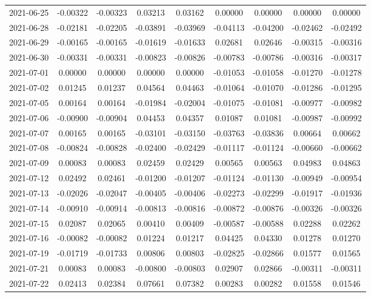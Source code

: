 {\begin{footnotesize}
\begin{longtable}{lcccccccc}
2021-06-25 & -0.00322 & -0.00323 & 0.03213 & 0.03162 & 0.00000 & 0.00000 & 0.00000 & 0.00000 \\
2021-06-28 & -0.02181 & -0.02205 & -0.03891 & -0.03969 & -0.04113 & -0.04200 & -0.02462 & -0.02492 \\
2021-06-29 & -0.00165 & -0.00165 & -0.01619 & -0.01633 & 0.02681 & 0.02646 & -0.00315 & -0.00316 \\
2021-06-30 & -0.00331 & -0.00331 & -0.00823 & -0.00826 & -0.00783 & -0.00786 & -0.00316 & -0.00317 \\
2021-07-01 & 0.00000 & 0.00000 & 0.00000 & 0.00000 & -0.01053 & -0.01058 & -0.01270 & -0.01278 \\
2021-07-02 & 0.01245 & 0.01237 & 0.04564 & 0.04463 & -0.01064 & -0.01070 & -0.01286 & -0.01295 \\
2021-07-05 & 0.00164 & 0.00164 & -0.01984 & -0.02004 & -0.01075 & -0.01081 & -0.00977 & -0.00982 \\
2021-07-06 & -0.00900 & -0.00904 & 0.04453 & 0.04357 & 0.01087 & 0.01081 & -0.00987 & -0.00992 \\
2021-07-07 & 0.00165 & 0.00165 & -0.03101 & -0.03150 & -0.03763 & -0.03836 & 0.00664 & 0.00662 \\
2021-07-08 & -0.00824 & -0.00828 & -0.02400 & -0.02429 & -0.01117 & -0.01124 & -0.00660 & -0.00662 \\
2021-07-09 & 0.00083 & 0.00083 & 0.02459 & 0.02429 & 0.00565 & 0.00563 & 0.04983 & 0.04863 \\
2021-07-12 & 0.02492 & 0.02461 & -0.01200 & -0.01207 & -0.01124 & -0.01130 & -0.00949 & -0.00954 \\
2021-07-13 & -0.02026 & -0.02047 & -0.00405 & -0.00406 & -0.02273 & -0.02299 & -0.01917 & -0.01936 \\
2021-07-14 & -0.00910 & -0.00914 & -0.00813 & -0.00816 & -0.00872 & -0.00876 & -0.00326 & -0.00326 \\
2021-07-15 & 0.02087 & 0.02065 & 0.00410 & 0.00409 & -0.00587 & -0.00588 & 0.02288 & 0.02262 \\
2021-07-16 & -0.00082 & -0.00082 & 0.01224 & 0.01217 & 0.04425 & 0.04330 & 0.01278 & 0.01270 \\
2021-07-19 & -0.01719 & -0.01733 & 0.00806 & 0.00803 & -0.02825 & -0.02866 & 0.01577 & 0.01565 \\
2021-07-21 & 0.00083 & 0.00083 & -0.00800 & -0.00803 & 0.02907 & 0.02866 & -0.00311 & -0.00311 \\
2021-07-22 & 0.02413 & 0.02384 & 0.07661 & 0.07382 & 0.00283 & 0.00282 & 0.01558 & 0.01546 \\

\end{longtable}
\end{footnotesize}}
